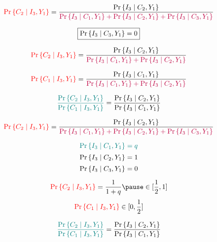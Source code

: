 \begin{frame}{}
  \[
    \textcolor{red}{\Pr\left\{C_2 \mid I_3, Y_1\right\}} = \frac{\Pr{\left\{I_3 \mid C_2, Y_1\right\}}}
      {\textcolor{purple}{\Pr\left\{I_3 \mid C_1, Y_1\right\} + \Pr\left\{I_3 \mid C_2, Y_1\right\} + \Pr\left\{I_3 \mid C_3, Y_1\right\}}}
  \]

  \pause
  \[
    \boxed{\Pr\left\{I_3 \mid C_3, Y_1\right\} = 0}
  \]

  \pause
  \[
    \textcolor{red}{\Pr\left\{C_2 \mid I_3, Y_1\right\}} = \frac{\Pr{\left\{I_3 \mid C_2, Y_1\right\}}}
      {\textcolor{purple}{\Pr\left\{I_3 \mid C_1, Y_1\right\} + \Pr\left\{I_3 \mid C_2, Y_1\right\}}}
  \]

  \pause
  \[
    \textcolor{red}{\Pr\left\{C_1 \mid I_3, Y_1\right\}} = \frac{\Pr{\left\{I_3 \mid C_1, Y_1\right\}}}
      {\textcolor{purple}{\Pr\left\{I_3 \mid C_1, Y_1\right\} + \Pr\left\{I_3 \mid C_2, Y_1\right\}}}
  \]

  \pause
  \vspace{0.30cm}
  \[
    \textcolor{teal}{\frac{\Pr\left\{C_2 \mid I_3, Y_1\right\}}{\Pr\left\{C_1 \mid I_3, Y_1\right\}}} = \frac{\Pr{\left\{I_3 \mid C_2, Y_1\right\}}}
    {\Pr\left\{I_3 \mid C_1, Y_1\right\}}
  \]

\end{frame}

\begin{frame}{}
  \begin{center}
  \end{center}
\end{frame}

\begin{frame}{}
  \[
    \textcolor{red}{\Pr\left\{C_2 \mid I_3, Y_1\right\}} = \frac{\Pr{\left\{I_3 \mid C_2, Y_1\right\}}}
      {\textcolor{purple}{\Pr\left\{I_3 \mid C_1, Y_1\right\} + \Pr\left\{I_3 \mid C_2, Y_1\right\} + \textcolor{purple}{\Pr\left\{I_3 \mid C_3, Y_1\right\}}}}
  \]

  \pause
  \[
    \textcolor{teal}{\Pr\left\{I_3 \mid C_1, Y_1\right\} = q}
  \]
  \[
    \Pr\left\{I_3 \mid C_2, Y_1\right\} = 1
  \]
  \[
    \Pr\left\{I_3 \mid C_3, Y_1\right\} = 0
  \]

  \pause
  \[
    \red{\Pr\set{C_2 \mid I_3, Y_1}} = \frac{1}{1 + q} \pause \in [\frac{1}{2}, 1]
  \]
  \pause
  \[
    \textcolor{red}{\Pr\left\{C_1 \mid I_3, Y_1\right\}} \in [0, \frac{1}{2}]
  \]

  \pause
  \centerline{}

  \pause
  \[
    \textcolor{teal}{\frac{\Pr\left\{C_2 \mid I_3, Y_1\right\}}{\Pr\left\{C_1 \mid I_3, Y_1\right\}}} = \frac{\Pr{\left\{I_3 \mid C_2, Y_1\right\}}}
    {\Pr\left\{I_3 \mid C_1, Y_1\right\}}
  \]
\end{frame}

